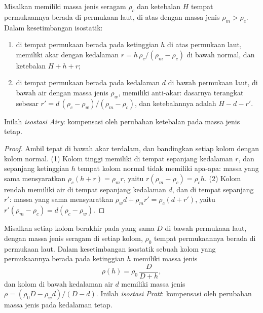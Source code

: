 \begin{proposition}\label{prop:b1:isostasy-gravity:airy}
Misalkan  memiliki massa jenis seragam $\rho_c$ dan ketebalan $H$ tempat permukaannya berada di permukaan laut, di atas  dengan massa jenis $\rho_m > \rho_c$. Dalam kesetimbangan isostatik:
\begin{enumerate}
  \item di tempat permukaan berada pada ketinggian $h$ di atas permukaan laut,  memiliki akar dengan kedalaman $r = h\,\rho_c/(\rho_m - \rho_c)$ di bawah  normal,
        dan ketebalan $H + h + r$;
  \item di tempat permukaan berada pada kedalaman $d$ di bawah permukaan laut, di bawah air dengan massa jenis $\rho_w$,  memiliki anti-akar: dasarnya terangkat sebesar
        $r' = d\,(\rho_c - \rho_w)/(\rho_m - \rho_c)$, dan ketebalannya adalah
        $H - d - r'$.
\end{enumerate}
Inilah \emph{isostasi Airy}: kompensasi oleh perubahan ketebalan pada massa jenis tetap.
\end{proposition}

\begin{proof}
Ambil  tepat di bawah akar terdalam, dan bandingkan setiap kolom dengan kolom normal. (1) Kolom tinggi memiliki  di tempat  sepanjang kedalaman $r$, dan  sepanjang ketinggian $h$ tempat kolom normal tidak memiliki apa-apa: massa yang sama mensyaratkan $\rho_c(h + r) = \rho_m r$, yaitu
$r(\rho_m - \rho_c) = \rho_c h$. (2) Kolom rendah memiliki air di tempat  sepanjang kedalaman $d$, dan  di tempat  sepanjang $r'$: massa yang sama mensyaratkan
$\rho_w d + \rho_m r' = \rho_c(d + r')$, yaitu $r'(\rho_m - \rho_c) =
d(\rho_c - \rho_w)$.
\end{proof}

\begin{proposition}\label{prop:b1:isostasy-gravity:pratt}
Misalkan setiap kolom berakhir pada  yang sama $D$ di bawah permukaan laut, dengan massa jenis seragam di setiap kolom, $\rho_0$ tempat permukaannya berada di permukaan laut. Dalam kesetimbangan isostatik sebuah kolom yang permukaannya berada pada ketinggian $h$ memiliki massa jenis
\[
  \rho(h) = \rho_0\,\frac{D}{D + h},
\]
dan kolom di bawah kedalaman air $d$ memiliki massa jenis
$\rho = (\rho_0 D - \rho_w d)/(D - d)$. Inilah \emph{isostasi Pratt}: kompensasi oleh perubahan massa jenis pada kedalaman tetap.
\end{proposition}

